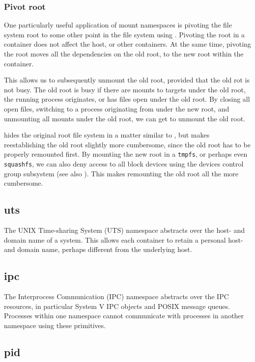 \subsubsection{Pivot root}

One particularly useful application of mount namespaces is pivoting the file
system root to some other point in the file system using
\cite{man-2-pivot-root}. Pivoting the root in a container does not affect the
host, or other containers. At the same time, pivoting the root moves all the
dependencies on the old root, to the new root within the container.

This allows us to subsequently unmount the old root, provided that the old rot
is not busy. The old root is busy if there are mounts to targets under the old
root, the running process originates, or has files open under the old root.  By
closing all open files, switching to a process originating from under the new
root, and unmounting all mounts under the old root, we can get to unmount the
old root.

\cite{man-2-pivot-root} hides the original root file system in a matter similar
to \cite{man-2-chroot}, but makes reestablishing the old root slightly more
cumbersome, since the old root has to be properly remounted first. By mounting
the new root in a \texttt{tmpfs}, or perhaps even \texttt{squashfs}, we can
also deny access to all block devices using the devices control group subsystem
(see also ). This makes remounting the
old root all the more cumbersome.

\subsection{uts}

The UNIX Time-sharing System (UTS) namespace abstracts over the host- and domain
name of a system. This allows each container to retain a personal host- and
domain name, perhaps different from the underlying host.

\subsection{ipc}

The Interprocess Communication (IPC) namespace abstracts over the IPC
resources, in particular System V IPC objects and POSIX message queues.
Processes within one namespace cannot communicate with processes in another
namespace using these primitives.

\subsection{pid}

